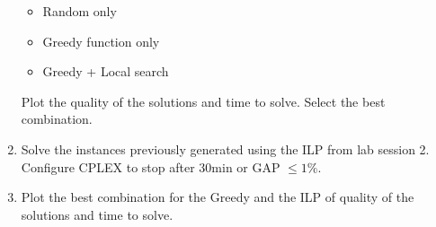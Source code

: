 \documentclass[12pt, a4paper]{article}
\begin{document}
\begin{enumerate}[label=(\alph*)]
      \begin{itemize}
          \item Random only
          \item Greedy function only
          \item Greedy + Local search
      \end{itemize}

    Plot the quality of the solutions and time to solve. Select the best combination.

    \item Solve the instances previously generated using the ILP from lab session 2.
    Configure CPLEX to stop after 30min or GAP $\le 1\%$.

    \item Plot the best combination for the Greedy and the ILP of quality of the solutions and time to solve.


\end{enumerate}
\end{document}
